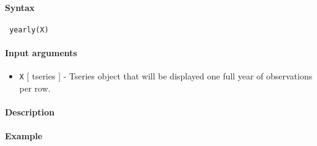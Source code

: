 


	\paragraph{Syntax}
 
 \begin{verbatim}
 yearly(X)
 \end{verbatim}
 
 \paragraph{Input arguments}
 
 \begin{itemize}
 \item
   \texttt{X} {[} tseries {]} - Tseries object that will be displayed one
   full year of observations per row.
 \end{itemize}
 
 \paragraph{Description}
 
 \paragraph{Example}


